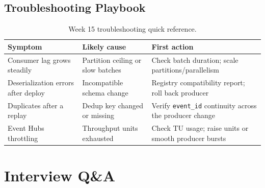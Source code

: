 \subsection{Troubleshooting Playbook}
\begin{table}[H]
\centering
\small
\begin{tabular}{@{}p{3.6cm}p{4.2cm}p{4.8cm}@{}}
\toprule
\textbf{Symptom} & \textbf{Likely cause} & \textbf{First action} \\
\midrule
Consumer lag grows steadily & Partition ceiling or slow batches & Check batch duration; scale partitions/parallelism \\
Deserialization errors after deploy & Incompatible schema change & Registry compatibility report; roll back producer \\
Duplicates after a replay & Dedup key changed or missing & Verify \texttt{event\_id} continuity across the producer change \\
Event Hubs throttling & Throughput units exhausted & Check TU usage; raise units or smooth producer bursts \\
\bottomrule
\end{tabular}
\caption{Week 15 troubleshooting quick reference.}
\label{tab:ch15-trouble}
\end{table}

\section{Interview Q\&A}

